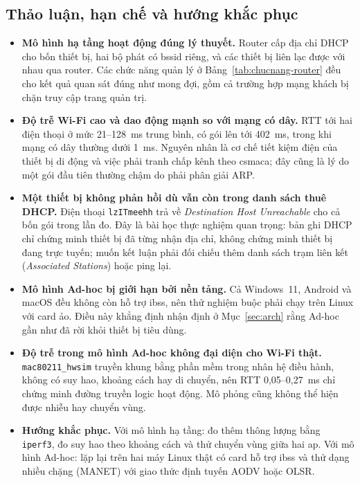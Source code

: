 \subsection{Thảo luận, hạn chế và hướng khắc phục}
\begin{itemize}[leftmargin=*]
  \item \textbf{Mô hình hạ tầng hoạt động đúng lý thuyết.} Router cấp địa chỉ
    DHCP cho bốn thiết bị, hai bộ phát có \ac{bssid} riêng, và các thiết bị liên
    lạc được với nhau qua router. Các chức năng quản lý ở
    Bảng~\ref{tab:chucnang-router} đều cho kết quả quan sát đúng như mong đợi,
    gồm cả trường hợp mạng khách bị chặn truy cập trang quản trị.
  \item \textbf{Độ trễ Wi-Fi cao và dao động mạnh so với mạng có dây.} RTT tới
    hai điện thoại ở mức 21--128~ms trung bình, có gói lên tới 402~ms, trong khi
    mạng có dây thường dưới 1~ms. Nguyên nhân là cơ chế tiết kiệm điện của thiết
    bị di động và việc phải tranh chấp kênh theo \ac{csmaca}; đây cũng là lý do
    một gói đầu tiên thường chậm do phải phân giải ARP.
  \item \textbf{Một thiết bị không phản hồi dù vẫn còn trong danh sách thuê
    DHCP.} Điện thoại \texttt{lzITmeehh} trả về \emph{Destination Host
    Unreachable} cho cả bốn gói trong lần đo. Đây là bài học thực nghiệm quan
    trọng: bản ghi DHCP chỉ chứng minh thiết bị đã từng nhận địa chỉ, không
    chứng minh thiết bị đang trực tuyến; muốn kết luận phải đối chiếu thêm danh
    sách trạm liên kết (\emph{Associated Stations}) hoặc ping lại.
  \item \textbf{Mô hình Ad-hoc bị giới hạn bởi nền tảng.} Cả Windows~11, Android
    và macOS đều không còn hỗ trợ \ac{ibss}, nên thử nghiệm buộc phải chạy trên
    Linux với card ảo. Điều này khẳng định nhận định ở Mục~\ref{sec:arch} rằng
    Ad-hoc gần như đã rời khỏi thiết bị tiêu dùng.
  \item \textbf{Độ trễ trong mô hình Ad-hoc không đại diện cho Wi-Fi thật.}
    \texttt{mac80211\_hwsim} truyền khung bằng phần mềm trong nhân hệ điều hành,
    không có suy hao, khoảng cách hay di chuyển, nên RTT 0,05--0,27~ms chỉ chứng
    minh đường truyền logic hoạt động. Mô phỏng cũng không thể hiện được nhiễu
    hay chuyển vùng.
  \item \textbf{Hướng khắc phục.} Với mô hình hạ tầng: đo thêm thông lượng bằng
    \texttt{iperf3}, đo suy hao theo khoảng cách và thử chuyển vùng giữa hai
    \ac{ap}. Với mô hình Ad-hoc: lặp lại trên hai máy Linux thật có card hỗ trợ
    \ac{ibss} và thử dạng nhiều chặng (MANET) với giao thức định tuyến AODV hoặc
    OLSR.
\end{itemize}

\endgroup
